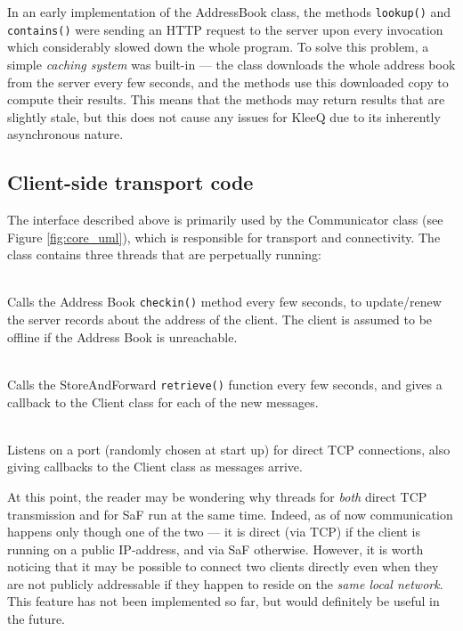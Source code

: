 \documentclass[a4paper, 12pt]{report}
\begin{document}
In an early implementation of the AddressBook class, the methods \texttt{lookup()} and \texttt{contains()} were sending an HTTP request to the server upon every invocation which considerably slowed down the whole program. To solve this problem, a simple \emph{caching system} was built-in --- the class downloads the whole address book from the server every few seconds, and the methods use this downloaded copy to compute their results. This means that the methods may return results that are slightly stale, but this does not cause any issues for KleeQ due to its inherently asynchronous nature. \\


\subsection{Client-side transport code}
\label{subsec:impl.prep.transport}
The interface described above is primarily used by the Communicator class (see Figure \ref{fig:core_uml}), which is responsible for transport and connectivity. The class contains three threads that are perpetually running:
\begin{description}[labelindent=0.5cm, leftmargin=1.3cm, rightmargin=0.5cm]
    \item[Address-reporting thread] \hfill \\
        Calls the Address Book \texttt{checkin()} method every few seconds, to update/renew the server records about the address of the client. The client is assumed to be offline if the Address Book is unreachable.
    \item[SaF Querying Thread] \hfill \\
        Calls the StoreAndForward \texttt{retrieve()} function every few seconds, and gives a callback to the Client class for each of the new messages.
    \item[TCP Socket Server Thread] \hfill \\
        Listens on a port (randomly chosen at start up) for direct TCP connections, also giving callbacks to the Client class as messages arrive.
\end{description}
At this point, the reader may be wondering why threads for \emph{both} direct TCP transmission and for SaF run at the same time. Indeed, as of now communication happens only though one of the two --- it is direct (via TCP) if the client is running on a public IP-address, and via SaF otherwise. However, it is worth noticing that it may be possible to connect two clients directly even when they are not publicly addressable if they happen to reside on the \emph{same local network}. This feature has not been implemented so far, but would definitely be useful in the future. \\
\end{document}
